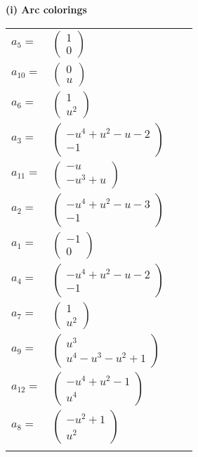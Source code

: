 \documentclass[1p]{elsarticle_modified}
\theoremstyle{definition}
\begin{document}
\flushleft \textbf{(i) Arc colorings}\\
\begin{tabular}{m{7pt} m{180pt} m{7pt} m{180pt} }
\flushright $a_{5}=$&$\begin{pmatrix}1\\0\end{pmatrix}$ \\
\flushright $a_{10}=$&$\begin{pmatrix}0\\u\end{pmatrix}$ \\
\flushright $a_{6}=$&$\begin{pmatrix}1\\u^2\end{pmatrix}$ \\
\flushright $a_{3}=$&$\begin{pmatrix}- u^4+u^2- u-2\\-1\end{pmatrix}$ \\
\flushright $a_{11}=$&$\begin{pmatrix}- u\\- u^3+u\end{pmatrix}$ \\
\flushright $a_{2}=$&$\begin{pmatrix}- u^4+u^2- u-3\\-1\end{pmatrix}$ \\
\flushright $a_{1}=$&$\begin{pmatrix}-1\\0\end{pmatrix}$ \\
\flushright $a_{4}=$&$\begin{pmatrix}- u^4+u^2- u-2\\-1\end{pmatrix}$ \\
\flushright $a_{7}=$&$\begin{pmatrix}1\\u^2\end{pmatrix}$ \\
\flushright $a_{9}=$&$\begin{pmatrix}u^3\\u^4- u^3- u^2+1\end{pmatrix}$ \\
\flushright $a_{12}=$&$\begin{pmatrix}- u^4+u^2-1\\u^4\end{pmatrix}$ \\
\flushright $a_{8}=$&$\begin{pmatrix}- u^2+1\\u^2\end{pmatrix}$\\&\end{tabular}
\end{document}
